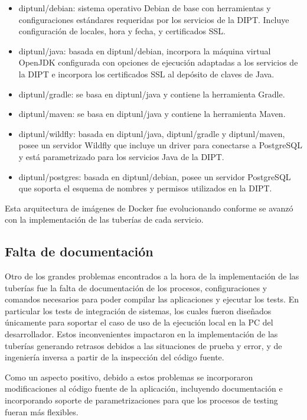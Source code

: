 \begin{itemize}
\item diptunl/debian: sistema operativo Debian de base con
  herramientas y configuraciones estándares requeridas por los
  servicios de la DIPT. Incluye configuración de locales, hora y
  fecha, y certificados SSL.
\item diptunl/java: basada en diptunl/debian, incorpora la máquina
  virtual OpenJDK configurada con opciones de ejecución adaptadas a
  los servicios de la DIPT e incorpora los certificados SSL al
  depósito de claves de Java.
\item diptunl/gradle: se basa en diptunl/java y contiene la
  herramienta Gradle.
\item diptunl/maven: se basa en diptunl/java y contiene la herramienta
  Maven.
\item diptunl/wildfly: basada en diptunl/java, diptunl/gradle y
  diptunl/maven, posee un servidor Wildfly que incluye un driver para
  conectarse a PostgreSQL y está parametrizado para los servicios Java
  de la DIPT.
\item diptunl/postgres: basada en diptunl/debian, posee un servidor
  PostgreSQL que soporta el esquema de nombres y permisos utilizados
  en la DIPT.
\end{itemize}
Esta arquitectura de imágenes de Docker fue evolucionando conforme se
avanzó con la implementación de las tuberías de cada servicio.

\subsection{Falta de documentación}

Otro de los grandes problemas encontrados a la hora de la
implementación de las tuberías fue la falta de documentación de los
procesos, configuraciones y comandos necesarios para poder compilar
las aplicaciones y ejecutar los tests. En particular los tests de
integración de sistemas, los cuales fueron diseñados únicamente para
soportar el caso de uso de la ejecución local en la PC del
desarrollador. Estos inconvenientes impactaron en la implementación de
las tuberías generando retrasos debidos a las situaciones de prueba y
error, y de ingeniería inversa a partir de la inspección del código
fuente.

Como un aspecto positivo, debido a estos problemas se incorporaron
modificaciones al código fuente de la aplicación, incluyendo
documentación e incorporando soporte de parametrizaciones para que los
procesos de testing fueran más flexibles.
